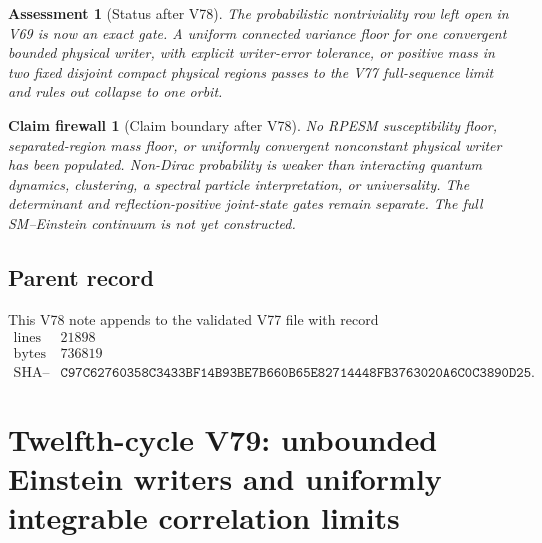 \documentclass[11pt]{article}
\newtheorem{firewall}[theorem]{Claim firewall}
\newtheorem{assessment}[theorem]{Assessment}
\theoremstyle{remark}
\begin{document}
\begin{assessment}[Status after V78]
\label{ass:v12v78-status}
The probabilistic nontriviality row left open in V69 is now an exact
gate.  A uniform connected variance floor for one convergent bounded
physical writer, with explicit writer-error tolerance, or positive
mass in two fixed disjoint compact physical regions passes to the
V77 full-sequence limit and rules out collapse to one orbit.
\end{assessment}

\begin{firewall}[Claim boundary after V78]
\label{fire:v12v78-claim}
No RPESM susceptibility floor, separated-region mass floor, or
uniformly convergent nonconstant physical writer has been populated.
Non-Dirac probability is weaker than interacting quantum dynamics,
clustering, a spectral particle interpretation, or universality.
The determinant and reflection-positive joint-state gates remain
separate.  The full SM--Einstein continuum is not yet constructed.
\end{firewall}

\subsection{Parent record}

This V78 note appends to the validated V77 file with record
\[
\begin{array}{c|c}
\text{lines}&21898\\
\text{bytes}&736819\\
\text{SHA--256}&
\texttt{C97C62760358C3433BF14B93BE7B660B65E82714448FB3763020A6C0C3890D25}.
\end{array}
\]



\section{Twelfth-cycle V79: unbounded Einstein writers and
uniformly integrable correlation limits}
\label{sec:v12v79}
\end{document}
